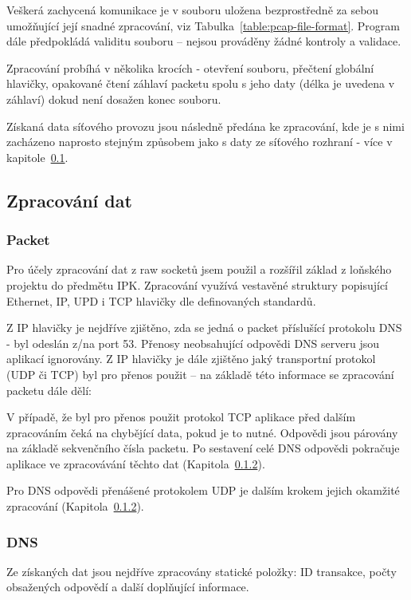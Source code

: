 \documentclass[11pt]{article}
\begin{document}
	Veškerá zachycená komunikace je v souboru uložena bezprostředně za sebou umožňující její snadné zpracování, viz Tabulka~\ref{table:pcap-file-format}.
	Program dále předpokládá validitu souboru -- nejsou prováděny žádné kontroly a validace.
	
	Zpracování probíhá v několika krocích - otevření souboru, přečtení globální hlavičky, opakované čtení záhlaví packetu spolu s jeho daty (délka je uvedena v záhlaví) dokud není dosažen konec souboru.
	
	Získaná data síťového provozu jsou následně předána ke zpracování, kde je s nimi zacházeno naprosto stejným způsobem jako s daty ze síťového rozhraní - více v kapitole~\ref{section:data-processing}.

	\subsection{Zpracování dat} \label{section:data-processing}
	\subsubsection{Packet} \label{section:data-processing:packet}
	Pro účely zpracování dat z raw socketů jsem použil a rozšířil základ z loňského projektu do předmětu IPK.
	Zpracování využívá vestavěné struktury popisující Ethernet, IP\cite{RFC0791}, UPD\cite{RFC0768} i TCP\cite{RFC0793} hlavičky dle definovaných standardů.
	
	Z IP hlavičky je nejdříve zjištěno, zda se jedná o packet příslušící protokolu DNS - byl odeslán z/na port \textsf{53}\cite{RFC1035}.
	Přenosy neobsahující odpovědi DNS serveru jsou aplikací ignorovány.
	Z IP hlavičky je dále zjištěno jaký transportní protokol (UDP či TCP) byl pro přenos použit -- na základě této informace se zpracování packetu dále dělí:
	
	V případě, že byl pro přenos použit protokol TCP aplikace před dalším zpracováním čeká na chybějící data, pokud je to nutné\cite{RFC7766}.
	Odpovědi jsou párovány na základě sekvenčního čísla packetu\cite{RFC0793}.
	Po sestavení celé DNS odpovědi pokračuje aplikace ve zpracovávání těchto dat (Kapitola~\ref{section:data-processing:dns}).
	
	Pro DNS odpovědi přenášené protokolem UDP je dalším krokem jejich okamžité zpracování (Kapitola~\ref{section:data-processing:dns}).
	
	\subsubsection{DNS} \label{section:data-processing:dns}
	Ze získaných dat jsou nejdříve zpracovány statické položky: ID transakce, počty obsažených odpovědí a další doplňující informace\cite{RFC1035}.
	
\end{document}
